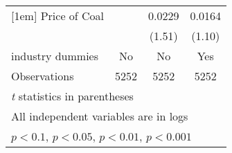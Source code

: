 \begin{table}[htbp]
\begin{tabular}{l*{3}{c}}
[1em]
Price of Coal       &                     &      0.0229         &      0.0164         \\
                    &                     &      (1.51)         &      (1.10)         \\
[1em]
industry dummies    &          No         &          No         &         Yes         \\
\hline
Observations        &        5252         &        5252         &        5252         \\
\hline\hline
\multicolumn{4}{l}{\footnotesize \textit{t} statistics in parentheses}\\
\multicolumn{4}{l}{\footnotesize All independent variables are in logs}\\
\multicolumn{4}{l}{\footnotesize \sym{+} \(p<0.1\), \sym{*} \(p<0.05\), \sym{**} \(p<0.01\), \sym{***} \(p<0.001\)}\\
\end{tabular}
\end{table}
